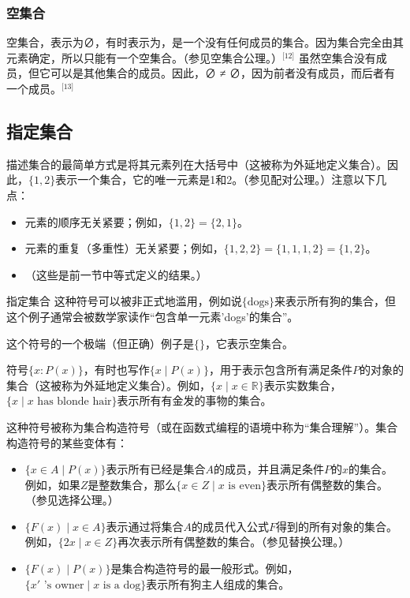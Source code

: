 \subsubsection{空集合}  
空集合，表示为∅，有时表示为{}，是一个没有任何成员的集合。因为集合完全由其元素确定，所以只能有一个空集合。（参见空集合公理。）\(^\text{[12]}\) 虽然空集合没有成员，但它可以是其他集合的成员。因此，∅ ≠ {∅}，因为前者没有成员，而后者有一个成员。\(^\text{[13]}\)
\subsection{指定集合}   
描述集合的最简单方式是将其元素列在大括号中（这被称为外延地定义集合）。因此，$\{1, 2\}$表示一个集合，它的唯一元素是1和2。（参见配对公理。）注意以下几点：

\begin{itemize}
\item 元素的顺序无关紧要；例如，$\{1, 2\} = \{2, 1\}$。
\item 元素的重复（多重性）无关紧要；例如，$\{1, 2, 2\} = \{1, 1, 1, 2\} = \{1, 2\}$。
\item （这些是前一节中等式定义的结果。）
\end{itemize}

指定集合  
这种符号可以被非正式地滥用，例如说$\{ \text{dogs} \}$来表示所有狗的集合，但这个例子通常会被数学家读作“包含单一元素'dogs'的集合”。

这个符号的一个极端（但正确）例子是$\{\}$，它表示空集合。

符号$\{x : P(x)\}$，有时也写作$\{x \mid P(x)\}$，用于表示包含所有满足条件$P$的对象的集合（这被称为外延地定义集合）。例如，$\{x \mid x \in \mathbb{R}\}$表示实数集合，$\{x \mid x \text{ has blonde hair}\}$表示所有有金发的事物的集合。

这种符号被称为集合构造符号（或在函数式编程的语境中称为“集合理解”）。集合构造符号的某些变体有：
\begin{itemize}
\item $\{x \in A \mid P(x)\}$表示所有已经是集合$A$的成员，并且满足条件$P$的$x$的集合。例如，如果$Z$是整数集合，那么$\{x \in Z \mid x \text{ is even}\}$表示所有偶整数的集合。（参见选择公理。）
\item $\{F(x) \mid x \in A\}$表示通过将集合$A$的成员代入公式$F$得到的所有对象的集合。例如，$\{2x \mid x \in Z\}$再次表示所有偶整数的集合。（参见替换公理。）
\item $\{F(x) \mid P(x)\}$是集合构造符号的最一般形式。例如，$\{x' \text{ 's owner} \mid x \text{ is a dog}\}$表示所有狗主人组成的集合。
\end{itemize}
